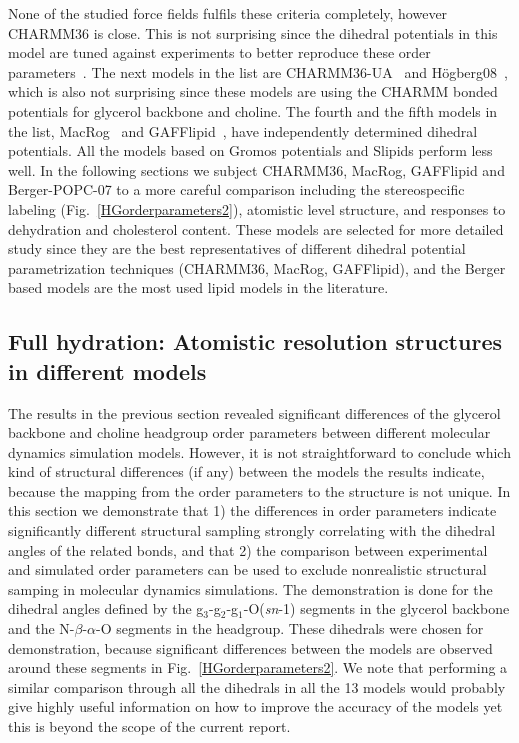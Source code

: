 \documentclass[journal=jpcbfk,manuscript=article]{achemso}
\begin{document}
None of the studied force fields fulfils these criteria completely, however CHARMM36 is close. 
This is not surprising since the dihedral potentials in this model are tuned against experiments to better reproduce these 
order parameters~\cite{klauda10}.
The next models in the list are CHARMM36-UA~\cite{henin08,lee14} and H\"ogberg08~\cite{hogberg08}, which is also not surprising since
these models are using the CHARMM bonded potentials for glycerol backbone and choline. The fourth and the fifth models in the list, MacRog~\cite{maciejewski14} and
GAFFlipid~\cite{dickson12}, have independently determined dihedral potentials. All the models based on Gromos potentials and Slipids perform less well.
In the following sections we subject CHARMM36, MacRog, GAFFlipid and Berger-POPC-07 to a more careful comparison including the stereospecific labeling  
(Fig.~\ref{HGorderparameters2}), atomistic level structure, and responses to dehydration and cholesterol content.
These models are selected for more detailed study since they are the best representatives of different dihedral potential parametrization techniques 
(CHARMM36, MacRog, GAFFlipid), and the Berger based models are the most used lipid models in the literature.


\subsection{Full hydration: Atomistic resolution structures in different models}

The results in the previous section revealed significant differences of the glycerol backbone and choline headgroup
order parameters between different molecular dynamics simulation models.
However, it is not straightforward to conclude which kind of structural differences (if any)
between the models the results indicate, because the mapping from the order parameters to the 
structure is not unique. In this section we demonstrate that 1) the differences in order parameters
indicate significantly different structural sampling strongly correlating with the dihedral angles of the related bonds,
and that 2) the comparison between experimental and simulated order parameters can be used to exclude
nonrealistic structural samping in molecular dynamics simulations. The demonstration is done for 
the dihedral angles defined by the g$_3$-g$_2$-g$_1$-O(\textit{sn}-1) segments in the glycerol backbone and 
the N-$\beta$-$\alpha$-O segments in the headgroup. These dihedrals were chosen for demonstration, because 
significant differences between the models are observed around these segments in Fig.~\ref{HGorderparameters2}.
We note that performing a similar comparison through all the dihedrals in all the 13 models would probably give highly useful
information on how to improve the accuracy of the models yet this is beyond the scope of the current report. 
\end{document}
